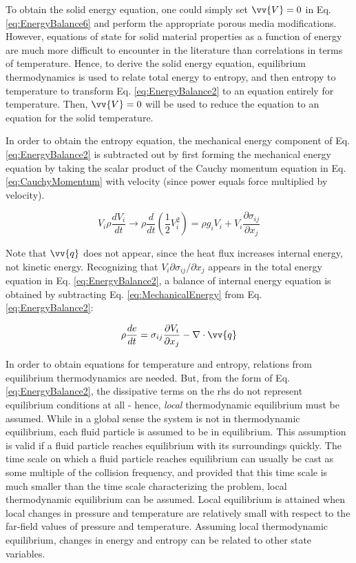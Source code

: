\documentclass[10pt]{article}
\numberwithin{equation}{section} %
\begin{document}
To obtain the solid energy equation, one could simply set \(\vv{V}=0\) in Eq. \eqref{eq:EnergyBalance6} and perform the appropriate porous media modifications. However, equations of state for solid material properties as a function of energy are much more difficult to encounter in the literature than correlations in terms of temperature. Hence, to derive the solid energy equation, equilibrium thermodynamics is used to relate total energy to entropy, and then entropy to temperature to transform Eq. \eqref{eq:EnergyBalance2} to an equation entirely for temperature. Then, \(\vv{V}=0\) will be used to reduce the equation to an equation for the solid temperature.

In order to obtain the entropy equation, the mechanical energy component of Eq. \eqref{eq:EnergyBalance2} is subtracted out by first forming the mechanical energy equation by taking the scalar product of the Cauchy momentum equation in Eq. \eqref{eq:CauchyMomentum} with velocity (since power equals force multiplied by velocity).

\begin{equation}
\label{eq:MechanicalEnergy}
V_i\rho\frac{dV_i}{dt}\rightarrow\rho\frac{d}{dt}\left(\frac{1}{2}V_i^2\right)=\rho g_iV_i+V_i\frac{\partial\sigma_{ij}}{\partial x_j}
\end{equation}

Note that \(\vv{q}\) does not appear, since the heat flux increases internal energy, not kinetic energy. Recognizing that \(V_i\partial\sigma_{ij}/\partial x_j\) appears in the total energy equation in Eq. \eqref{eq:EnergyBalance2}, a balance of internal energy equation is obtained by subtracting Eq. \eqref{eq:MechanicalEnergy} from Eq. \eqref{eq:EnergyBalance2}:

\begin{equation}
\label{eq:InternalEnergyEquation}
\rho\frac{de}{dt}=\sigma_{ij}\frac{\partial V_i}{\partial x_j}-\nabla\cdot\vv{q}
\end{equation}

In order to obtain equations for temperature and entropy, relations from equilibrium thermodynamics are needed. But, from the form of Eq. \eqref{eq:EnergyBalance2}, the dissipative terms on the \gls{rhs} do not represent equilibrium conditions at all - hence, \textit{local} thermodynamic equilibrium must be assumed. While in a global sense the system is not in thermodynamic equilibrium, each fluid particle is assumed to be in equilibrium. This assumption is valid if a fluid particle reaches equilibrium with its surroundings quickly. The time scale on which a fluid particle reaches equilibrium can usually be cast as some multiple of the collision frequency, and provided that this time scale is much smaller than the time scale characterizing the problem, local thermodynamic equilibrium can be assumed. Local equilibrium is attained when local changes in pressure and temperature are relatively small with respect to the far-field values of pressure and temperature. Assuming local thermodynamic equilibrium, changes in energy and entropy can be related to other state variables. 
\end{document}
